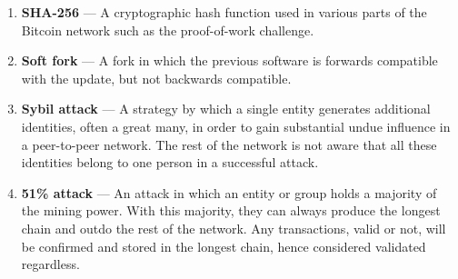 \documentclass[full.tex]{subfiles}
\begin{document}
\begin{enumerate}
        \item \textbf{SHA-256} --- A cryptographic hash function used in various parts of the Bitcoin network such as the proof-of-work challenge.
        \item \textbf{Soft fork} --- A fork in which the previous software is forwards compatible with the update, but not backwards compatible.
        \item \textbf{Sybil attack} --- A strategy by which a single entity generates additional identities, often a great many, in order to gain substantial undue influence in a peer-to-peer network. The rest of the network is not aware that all these identities belong to one person in a successful attack.
        \item \textbf{51\% attack} --- An attack in which an entity or group holds a majority of the mining power. With this majority, they can always produce the longest chain and outdo the rest of the network. Any transactions, valid or not, will be confirmed and stored in the longest chain, hence considered validated regardless.
    \end{enumerate}
\end{document}
